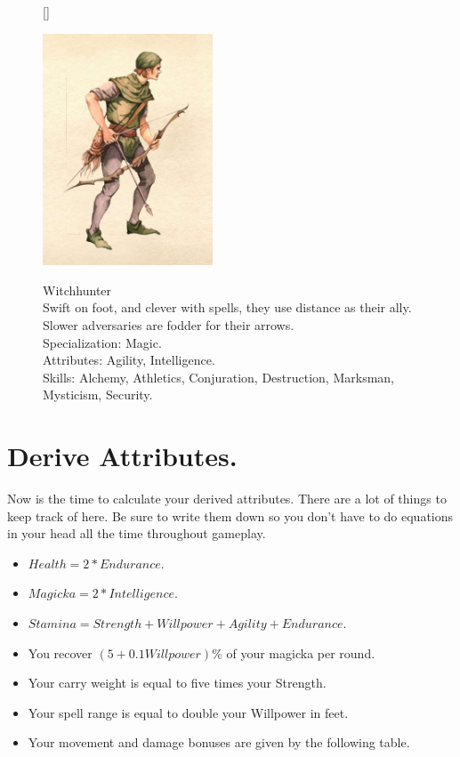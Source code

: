 \documentclass[12pt]{book}
\begin{document}
\begin{figure}[H]
[\FBwidth]
{\caption*{Witchhunter\\

Swift on foot, and clever with spells, they use distance as their ally. Slower adversaries are fodder for their arrows.\\

Specialization: Magic.\\

Attributes: Agility, Intelligence.\\

Skills: Alchemy, Athletics, Conjuration, Destruction, Marksman, Mysticism, Security.}\label{fig:test}}
{\includegraphics[width=0.45\textwidth]{Witchhunter.png}}
\end{figure}

\newpage
\section{Derive Attributes.}
Now is the time to calculate your derived attributes. There are a lot of things to keep track of here. Be sure to write them down so you don't have to do equations in your head all the time throughout gameplay.
\begin{itemize}
	\item $Health=2*Endurance$.
	\item $Magicka=2*Intelligence$.
	\item $Stamina=Strength+Willpower+Agility+Endurance$.
	\item You recover $(5+0.1Willpower)\%$ of your magicka per round.
	\item Your carry weight is equal to five times your Strength.
	\item Your spell range is equal to double your Willpower in feet. 
	\item Your movement and damage bonuses are given by the following table.
\end{itemize}
\end{document}
